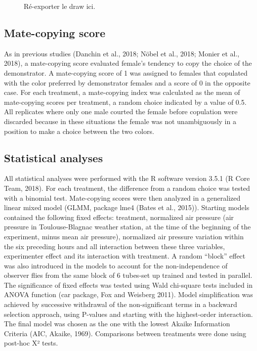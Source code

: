 \documentclass[a4paper, 12pt]{article}
\begin{document}
	\begin{figure}
		\caption{Ré-exporter le draw ici.}
	\end{figure}

	\subsection{Mate-copying score}

	As in previous studies (Danchin et al., 2018; Nöbel et al., 2018; Monier et al., 2018), a mate-copying score evaluated female’s tendency to copy the choice of the demonstrator. A mate-copying score of 1 was assigned to females that copulated with the color preferred by demonstrator females and a score of 0 in the opposite case. For each treatment, a mate-copying index was calculated as the mean of mate-copying scores per treatment, a random choice indicated by a value of 0.5. All replicates where only one male courted the female before copulation were discarded because in these situations the female was not unambiguously in a position to make a choice between the two colors.

	\subsection{Statistical analyses}

	All statistical analyses were performed with the R software version 3.5.1 (R Core Team, 2018).
	For each treatment, the difference from a random choice was tested with a binomial test. Mate-copying scores were then analyzed in a generalized linear mixed model (GLMM, package lme4 (Bates et al., 2015)). Starting models contained the following fixed effects: treatment, normalized air pressure (air pressure in Toulouse-Blagnac weather station, at the time of the beginning of the experiment, minus mean air pressure), normalized air pressure variation within the six preceding hours and all interaction between these three variables, experimenter effect and its interaction with treatment. A random “block” effect was also introduced in the models to account for the non-independence of observer flies from the same block of 6 tubes-set up trained and tested in parallel. The significance of fixed effects was tested using Wald chi-square tests included in ANOVA function (car package, Fox and Weisberg 2011). Model simplification was achieved by successive withdrawal of the non-significant terms in a backward selection approach, using P-values and starting with the highest-order interaction. The final model was chosen as the one with the lowest Akaike Information Criteria (AIC, Akaike, 1969). Comparisons between treatments were done using post-hoc X² tests. 
\end{document}
